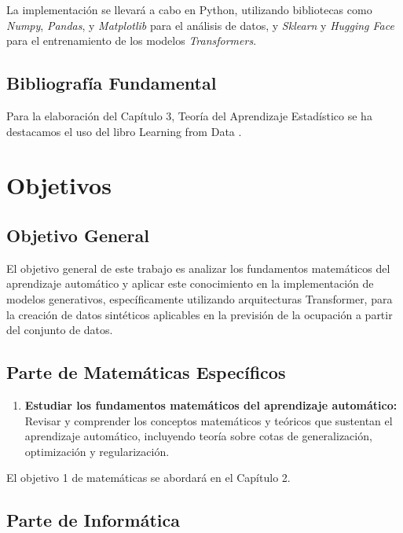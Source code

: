 La implementación se llevará a cabo en Python, utilizando bibliotecas como
\textit{Numpy}, \textit{Pandas}, y \textit{Matplotlib} para el análisis de
datos, y \textit{Sklearn} y \textit{Hugging Face} para el entrenamiento de los
modelos \textit{Transformers}.

\subsection{Bibliografía Fundamental}

Para la elaboración del Capítulo 3, Teoría del Aprendizaje Estadístico se ha
destacamos el uso del libro Learning from Data \cite{Mostafa2012}.

\section{Objetivos}

\subsection{Objetivo General}

El objetivo general de este trabajo es analizar los fundamentos matemáticos del
aprendizaje automático y aplicar este conocimiento en la implementación de
modelos generativos, específicamente utilizando arquitecturas Transformer, para
la creación de datos sintéticos aplicables en la previsión de la ocupación a
partir del conjunto de datos.

\subsection{Parte de Matemáticas Específicos}

    \begin{enumerate}
        \item \textbf{Estudiar los fundamentos matemáticos del aprendizaje automático:} 
        Revisar y comprender los conceptos matemáticos y teóricos que sustentan
        el aprendizaje automático, incluyendo teoría sobre cotas de
        generalización, optimización y regularización. 
            
    \end{enumerate}

El objetivo 1 de matemáticas se abordará en el Capítulo 2.

\subsection{Parte de Informática}
    
